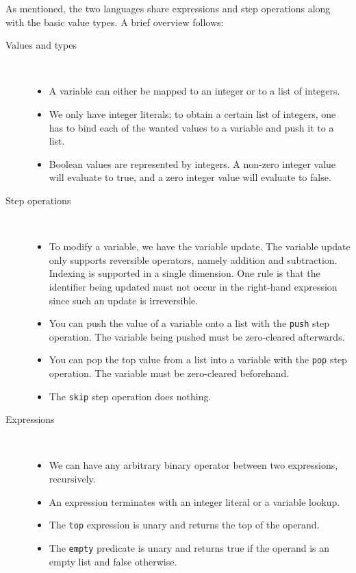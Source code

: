 As mentioned, the two languages share expressions and step operations along with the basic value types. A brief overview follows:\\
\begin{description}
  \item[Values and types]~\
  \begin{itemize}
    \item A variable can either be mapped to an integer or to a list of integers.
    \item We only have integer literals; to obtain a certain list of integers, one has to bind each of the wanted values to a variable and push it to a list.
    \item Boolean values are represented by integers. A non-zero integer value will evaluate to true, and a zero integer value will evaluate to false.
  \end{itemize}
  \item [Step operations]~\
  \begin{itemize}
    \item To modify a variable, we have the variable update. The variable update only supports reversible operators, namely addition and subtraction. Indexing is supported in a single dimension. One rule is that the identifier being updated must not occur in the right-hand expression since such an update is irreversible.
    \item You can push the value of a variable onto a list with the \texttt{push} step operation. The variable being pushed must be zero-cleared afterwards.
    \item You can pop the top value from a list into a variable with the \texttt{pop} step operation. The variable must be zero-cleared beforehand.
    \item The \texttt{skip} step operation does nothing.
  \end{itemize}
  \item [Expressions]~\
  \begin{itemize}
    \item We can have any arbitrary binary operator between two expressions, recursively.
    \item An expression terminates with an integer literal or a variable lookup.
    \item The \texttt{top} expression is unary and returns the top of the operand.
    \item The \texttt{empty} predicate is unary and returns true if the operand is an empty list and false otherwise.
  \end{itemize}
\end{description}
